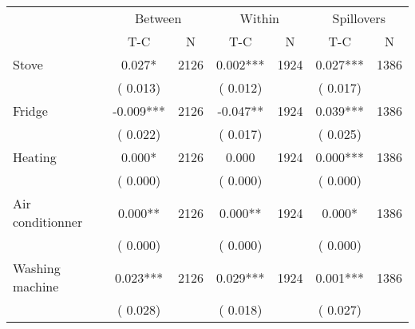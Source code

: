 
\begin{tabular}{l*{6}{c}}\hline&\multicolumn{2}{c}{Between}&\multicolumn{2}{c}{Within}&\multicolumn{2}{c}{Spillovers} \\ \cmidrule(r){2-3}\cmidrule(l){4-5}\cmidrule(l){6-7} & {T-C} & {N} & {T-C} & {N}  & {T-C}  & {N}  \\ \midrule
Stove        &              0.027*      &       2126       &              0.002***      &       1924       &              0.027***      &       1386       \\
                       &       (       0.013)            &                               &       (       0.012)            &                               &       (       0.017)            &                               \\
Fridge        &             -0.009***      &       2126       &             -0.047**      &       1924       &              0.039***      &       1386       \\
                       &       (       0.022)            &                               &       (       0.017)            &                               &       (       0.025)            &                               \\
Heating        &              0.000*      &       2126       &              0.000      &       1924       &              0.000***      &       1386       \\
                       &       (       0.000)            &                               &       (       0.000)            &                               &       (       0.000)            &                               \\
Air conditionner        &              0.000**      &       2126       &              0.000**      &       1924       &              0.000*      &       1386       \\
                       &       (       0.000)            &                               &       (       0.000)            &                               &       (       0.000)            &                               \\
Washing machine        &              0.023***      &       2126       &              0.029***      &       1924       &              0.001***      &       1386       \\
                       &       (       0.028)            &                               &       (       0.018)            &                               &       (       0.027)            &                               \\

\end{tabular}
